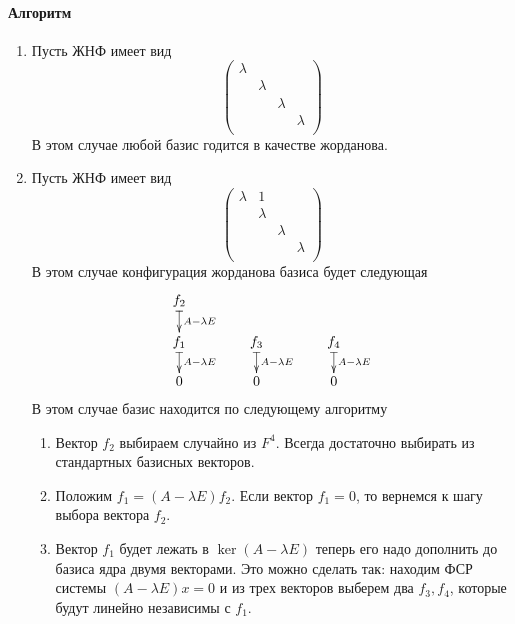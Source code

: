 \documentclass{article}
\begin{document}
\paragraph{Алгоритм}
\begin{enumerate}
\item Пусть ЖНФ имеет вид
\[
\begin{pmatrix}
{\lambda}&{}&{}&{}\\
{}&{\lambda}&{}&{}\\
{}&{}&{\lambda}&{}\\
{}&{}&{}&{\lambda}\\
\end{pmatrix}
\]
В этом случае любой базис годится в качестве жорданова.

\item Пусть ЖНФ имеет вид
\[
\begin{pmatrix}
{\lambda}&{1}&{}&{}\\
{}&{\lambda}&{}&{}\\
{}&{}&{\lambda}&{}\\
{}&{}&{}&{\lambda}\\
\end{pmatrix}
\]
В этом случае конфигурация жорданова базиса будет следующая
\[
\xymatrix@R=15pt@C=40pt{
  {f_2}\ar@{|->}[d]^{A-\lambda E}&{}&{}\\
  {f_1}\ar@{|->}[d]^{A-\lambda E}&{f_3}\ar@{|->}[d]^{A-\lambda E}&{f_4}\ar@{|->}[d]^{A-\lambda E}\\
  {0}&{0}&{0}
}
\]
В этом случае базис находится по следующему алгоритму
\begin{enumerate}
\item Вектор $f_2$ выбираем случайно из $F^4$. Всегда достаточно выбирать из стандартных базисных векторов.

\item Положим $f_1 = (A - \lambda E) f_2$. Если вектор $f_1 = 0$, то вернемся к шагу выбора вектора $f_2$.

\item Вектор $f_1$ будет лежать в $\ker(A - \lambda E)$ теперь его надо дополнить до базиса ядра двумя векторами. Это можно сделать так: находим ФСР системы $(A - \lambda E)x = 0$ и из трех векторов выберем два $f_3, f_4$, которые будут линейно независимы с $f_1$.
\end{enumerate}


\end{enumerate}
\end{document}
